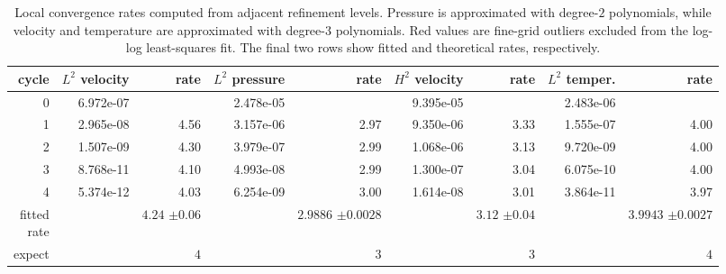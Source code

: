 \begin{table}[htbp]
\centering
\begin{tabular}{|r|r|r|r|r|r|r|r|r|}
\hline
cycle & \makecell{$L^{2}$\\velocity} & rate & \makecell{$L^{2}$\\pressure} & rate & \makecell{$H^{2}$\\velocity} & rate & \makecell{$L^{2}$\\temper.} & rate \\ \hline
0 & 6.972e-07 & \makecell{--} & 2.478e-05 & \makecell{--} & 9.395e-05 & \makecell{--} & 2.483e-06 & \makecell{--} \\ \hline
1 & 2.965e-08 & 4.56 & 3.157e-06 & 2.97 & 9.350e-06 & 3.33 & 1.555e-07 & 4.00 \\ \hline
2 & 1.507e-09 & 4.30 & 3.979e-07 & 2.99 & 1.068e-06 & 3.13 & 9.720e-09 & 4.00 \\ \hline
3 & 8.768e-11 & 4.10 & 4.993e-08 & 2.99 & 1.300e-07 & 3.04 & 6.075e-10 & 4.00 \\ \hline
4 & 5.374e-12 & 4.03 & 6.254e-09 & 3.00 & 1.614e-08 & 3.01 & 3.864e-11 & 3.97 \\ \hline
\makecell[r]{fitted\\rate} & \makecell{--} & \makecell[r]{$4.24 $\\$\pm  0.06$} & \makecell{--} & \makecell[r]{$2.9886 $\\$\pm  0.0028$} & \makecell{--} & \makecell[r]{$3.12 $\\$\pm  0.04$} & \makecell{--} & \makecell[r]{$3.9943 $\\$\pm  0.0027$} \\ \hline
expect & \makecell{--} & $4$ & \makecell{--} & $3$ & \makecell{--} & $3$ & \makecell{--} & $4$ \\ \hline
\end{tabular}
\caption{Local convergence rates computed from adjacent refinement levels. Pressure is approximated with degree-$2$ polynomials, while velocity and temperature are approximated with degree-$3$ polynomials. Red values are fine-grid outliers excluded from the log-log least-squares fit. The final two rows show fitted and theoretical rates, respectively.}
\end{table}
